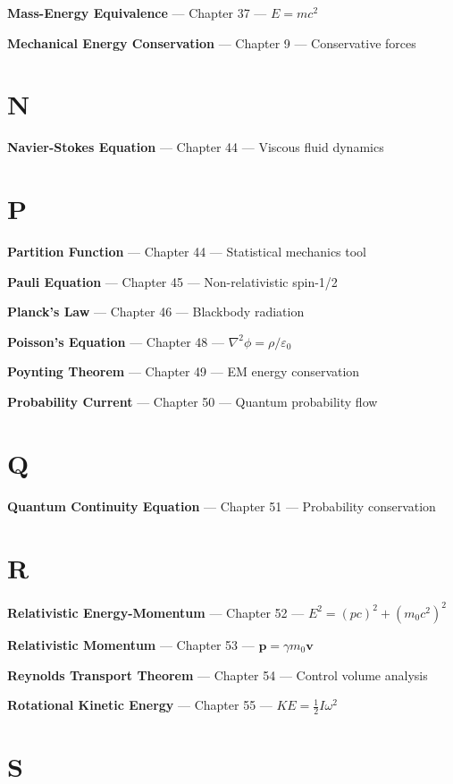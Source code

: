 \textbf{Mass-Energy Equivalence} --- Chapter 37 --- $E = mc^2$

\textbf{Mechanical Energy Conservation} --- Chapter 9 --- Conservative forces

\section*{N}

\textbf{Navier-Stokes Equation} --- Chapter 44 --- Viscous fluid dynamics

\section*{P}

\textbf{Partition Function} --- Chapter 44 --- Statistical mechanics tool

\textbf{Pauli Equation} --- Chapter 45 --- Non-relativistic spin-1/2

\textbf{Planck's Law} --- Chapter 46 --- Blackbody radiation

\textbf{Poisson's Equation} --- Chapter 48 --- $\nabla^2 \phi = \rho/\varepsilon_0$

\textbf{Poynting Theorem} --- Chapter 49 --- EM energy conservation

\textbf{Probability Current} --- Chapter 50 --- Quantum probability flow

\section*{Q}

\textbf{Quantum Continuity Equation} --- Chapter 51 --- Probability conservation

\section*{R}

\textbf{Relativistic Energy-Momentum} --- Chapter 52 --- $E^2 = (pc)^2 + (m_0c^2)^2$

\textbf{Relativistic Momentum} --- Chapter 53 --- $\mathbf{p} = \gamma m_0 \mathbf{v}$

\textbf{Reynolds Transport Theorem} --- Chapter 54 --- Control volume analysis

\textbf{Rotational Kinetic Energy} --- Chapter 55 --- $KE = \frac{1}{2}I\omega^2$

\section*{S}

